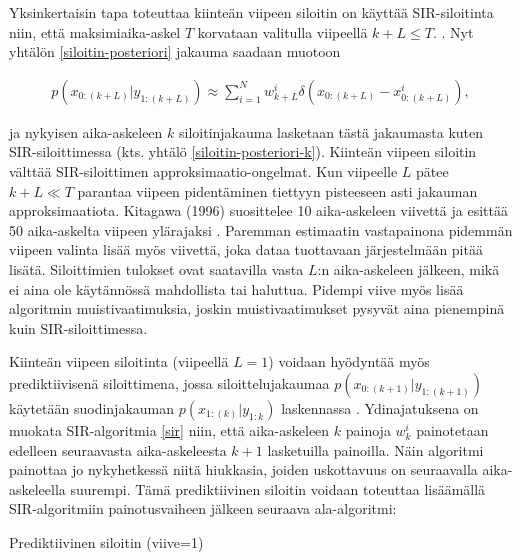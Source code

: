 \documentclass[
  12pt,
  a4paper, twoside]{book}
\begin{document}
Yksinkertaisin tapa toteuttaa kiinteän viipeen siloitin on käyttää SIR-siloitinta niin, että maksimiaika-askel \(T\) korvataan valitulla viipeellä \(k+L \le T\). \citep{kitagawa-1996}. Nyt yhtälön \ref{siloitin-posteriori} jakauma saadaan muotoon

\begin{align}\label{siloitin-posteriori-viive}
p(x_{0:(k+L)}|y_{1:(k+L)}) \approx \sum_{i=1}^N w_{k+L}^i \delta (x_{0:(k+L)}-x_{0:(k+L)}^i),
\end{align}

ja nykyisen aika-askeleen \(k\) siloitinjakauma lasketaan tästä jakaumasta kuten SIR-siloittimessa (kts. yhtälö \ref{siloitin-posteriori-k}). Kiinteän viipeen siloitin välttää SIR-siloittimen approksimaatio-ongelmat. Kun viipeelle \(L\) pätee \(k+L \ll T\) parantaa viipeen pidentäminen tiettyyn pisteeseen asti jakauman approksimaatiota. Kitagawa (1996) suosittelee 10 aika-askeleen viivettä ja esittää 50 aika-askelta viipeen ylärajaksi \citep{kitagawa-1996}. Paremman estimaatin vastapainona pidemmän viipeen valinta lisää myös viivettä, joka dataa tuottavaan järjestelmään pitää lisätä. Siloittimien tulokset ovat saatavilla vasta \(L\):n aika-askeleen jälkeen, mikä ei aina ole käytännössä mahdollista tai haluttua. Pidempi viive myös lisää algoritmin muistivaatimuksia, joskin muistivaatimukset pysyvät aina pienempinä kuin SIR-siloittimessa.

Kiinteän viipeen siloitinta (viipeellä \(L=1\)) voidaan hyödyntää myös prediktiivisenä siloittimena, jossa siloittelujakaumaa \(p(x_{0:(k+1)}|y_{1:(k+1)})\) käytetään suodinjakauman \(p(x_{1:(k)}|y_{1:k})\) laskennassa \citep{Nyobe-2021}. Ydinajatuksena on muokata SIR-algoritmia \ref{sir} niin, että aika-askeleen \(k\) painoja \(w_k^i\) painotetaan edelleen seuraavasta aika-askeleesta \(k+1\) lasketuilla painoilla. Näin algoritmi painottaa jo nykyhetkessä niitä hiukkasia, joiden uskottavuus on seuraavalla aika-askeleella suurempi. Tämä prediktiivinen siloitin voidaan toteuttaa lisäämällä SIR-algoritmiin painotusvaiheen jälkeen seuraava ala-algoritmi:

\begin{algorithm}[H]
\label{prediktiivinen-siloitin}
\DontPrintSemicolon
\SetAlgoShortEnd
{}
\caption{Prediktiivinen siloitin (viive=1)}
\end{algorithm}
\end{document}
